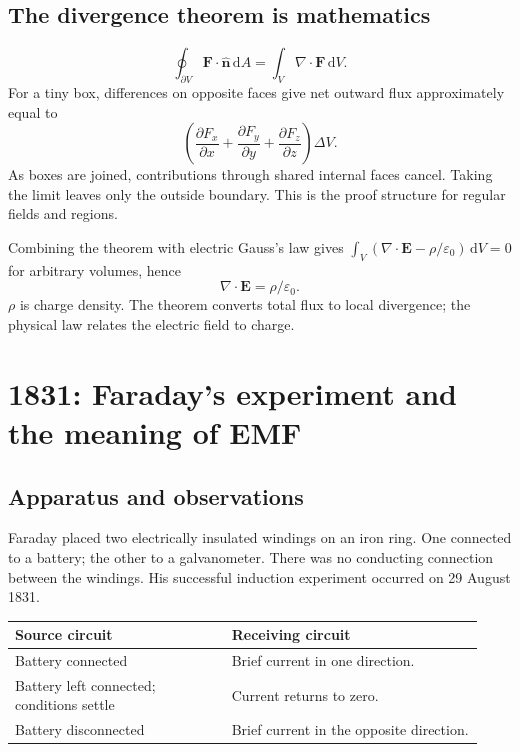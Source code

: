 \documentclass[11pt,letterpaper]{article}
\newcommand{\vect}[1]{\boldsymbol{#1}}
\newcommand{\dd}{\,\mathrm d}
\begin{document}
\subsection*{The divergence theorem is mathematics}
\begin{equation}
\oint_{\partial V}\vect F\cdot\hat{\vect n}\dd A
=\int_V\nabla\cdot\vect F\dd V.
\end{equation}
For a tiny box, differences on opposite faces give net outward flux approximately equal to
\[
\left(\frac{\partial F_x}{\partial x}+\frac{\partial F_y}{\partial y}
+\frac{\partial F_z}{\partial z}\right)\Delta V.
\]
As boxes are joined, contributions through shared internal faces cancel. Taking the limit leaves only the outside boundary. This is the proof structure for regular fields and regions.

Combining the theorem with electric Gauss's law gives $\int_V(\nabla\cdot\vect E-\rho/\varepsilon_0)\dd V=0$ for arbitrary volumes, hence
\begin{equation}
\boxed{\nabla\cdot\vect E=\rho/\varepsilon_0.}
\end{equation}
$\rho$ is charge density. The theorem converts total flux to local divergence; the physical law relates the electric field to charge.

\newpage
\section{1831: Faraday's experiment and the meaning of EMF}
\subsection*{Apparatus and observations}
Faraday placed two electrically insulated windings on an iron ring. One connected to a battery; the other to a galvanometer. There was no conducting connection between the windings. His successful induction experiment occurred on 29 August 1831.\cite{ring}

\begin{tabular}{P{0.43\linewidth}P{0.50\linewidth}}
\toprule
Source circuit & Receiving circuit\\\midrule
Battery connected & Brief current in one direction.\\
Battery left connected; conditions settle & Current returns to zero.\\
Battery disconnected & Brief current in the opposite direction.\\\bottomrule
\end{tabular}
\end{document}
